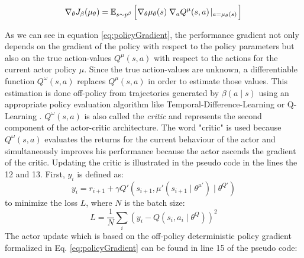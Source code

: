 \begin{equation}\label{eq:policyGradient}
    \nabla_\theta J_\beta (\mu_\theta) = 
    \operatorname{\mathbb{E}}_{s \sim p^\beta}
    \Big[ \nabla_\theta \mu_\theta(s) \; \nabla_a Q^\mu (s,a) \!\mid_{a = \mu_\theta (s)} \! \Big]
\end{equation}


As we can see in equation \ref{eq:policyGradient}, the performance gradient not only depends on the gradient of the policy with respect to the policy parameters but also on the true action-values $Q^\mu(s,a)$ with respect to the actions for the current actor policy $\mu$. Since the true action-values are unknown, a differentiable function $Q^ \omega(s,a)$ replaces $Q^\mu(s,a)$ in order to estimate those values. This estimation is done off-policy from trajectories generated by $\beta(a\!\mid\!s)$ using an appropriate policy evaluation algorithm like Temporal-Difference-Learning or Q-Learning \cite[p.~5]{silver2014deterministic}. $Q^ \omega(s,a)$ is also called the \textit{critic} and represents the second component of the actor-critic architecture. The word "critic" is used because $Q^ \omega(s,a)$ evaluates the returns for the current behaviour of the actor and simultaneously improves his performance because the actor ascends the gradient of the critic. Updating the critic is illustrated in the pseudo code in the lines the 12 and 13. First, $y_i$ is defined as:
\begin{equation*}
    y_i = r_{i+1} + \gamma Q' (s_{i+1}, \mu'(s_{i+1} \mid \theta^{\mu'})  \mid \theta^{Q'})
\end{equation*}
to minimize the loss $L$, where $N$ is the batch size:
\begin{equation*}
    L = \frac{1}{N} \sum_i{(y_i - Q(s_i, a_i \mid \theta^Q))^2}
\end{equation*}
The actor update which is based on the off-policy deterministic policy gradient formalized in Eq. \ref{eq:policyGradient} can be found in line 15 of the pseudo code:

